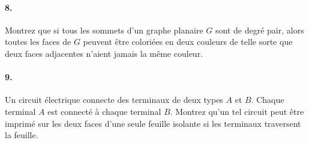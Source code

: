 \paragraph{8. }Montrez que si tous les sommets d’un graphe planaire $G$ sont de degré pair, alors toutes les faces de $G$ peuvent être coloriées en deux couleurs de telle sorte que deux faces adjacentes n’aient jamais la même couleur.

\begin{solution}
  \nosolution
\end{solution}

\paragraph{9. } Un circuit électrique connecte des terminaux de deux types $A$ et $B$. Chaque terminal $A$ est connecté à chaque terminal $B$. Montrez qu’un tel circuit peut être imprimé sur les deux faces d’une seule feuille isolante si les terminaux traversent la feuille.

\begin{solution}
  \nosolution
\end{solution}
